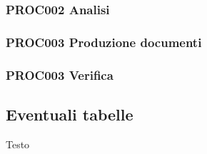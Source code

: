 	\subsubsection{PROC002 Analisi}
	
	\subsubsection{PROC003 Produzione documenti}
	
	\subsubsection{PROC003 Verifica}

\subsection{Eventuali tabelle}
Testo